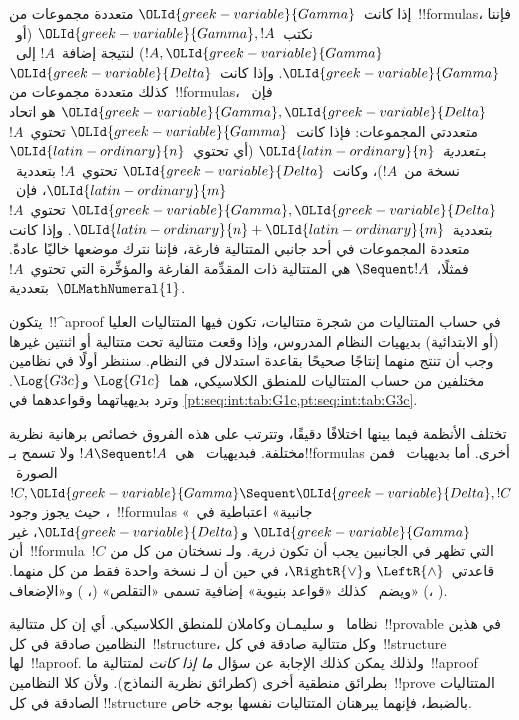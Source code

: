 \documentclass[../../../include/open-logic-section]{subfiles}
\begin{document}
إذا كانت~$\OLId{greek-variable}{Gamma}$ متعددة مجموعات من~!!{formula}s، فإننا نكتب~$\OLId{greek-variable}{Gamma},!A$
(أو~$!A,\OLId{greek-variable}{Gamma}$) لنتيجة إضافة~$!A$ إلى~$\OLId{greek-variable}{Gamma}$. وإذا كانت~$\OLId{greek-variable}{Delta}$ كذلك
متعددة مجموعات من~!!{formula}s، فإن~$\OLId{greek-variable}{Gamma},\OLId{greek-variable}{Delta}$ هو اتحاد متعددتي
المجموعات: فإذا كانت~$\OLId{greek-variable}{Gamma}$ تحتوي~$!A$ بـ\emph{تعددية}~$\OLId{latin-ordinary}{n}$ (أي تحتوي~$\OLId{latin-ordinary}{n}$ نسخة
من~$!A$)، وكانت~$\OLId{greek-variable}{Delta}$ تحتوي~$!A$ بتعددية~$\OLId{latin-ordinary}{m}$، فإن~$\OLId{greek-variable}{Gamma},\OLId{greek-variable}{Delta}$
تحتوي~$!A$ بتعددية~$\OLId{latin-ordinary}{n}+\OLId{latin-ordinary}{m}$. وإذا كانت متعددة المجموعات في أحد جانبي
المتتالية فارغة، فإننا نترك موضعها خاليًا عادةً. فمثلًا،~$\Sequent !A$
هي المتتالية ذات المقدِّمة الفارغة والمؤخِّرة التي تحتوي~$!A$ بتعددية~$\OLMathNumeral{1}$.

يتكون~!!^a{proof} في حساب المتتاليات من شجرة متتاليات، تكون فيها
المتتاليات العليا (أو الابتدائية) بديهيات النظام المدروس، وإذا وقعت متتالية
تحت متتالية أو اثنتين غيرها وجب أن تنتج منهما إنتاجًا صحيحًا بقاعدة
استدلال في النظام. سننظر أولًا في نظامين مختلفين من حساب المتتاليات للمنطق
الكلاسيكي، هما~$\Log{G1c}$ و$\Log{G3c}$. وترد بديهياتهما وقواعدهما في
\cref{pt:seq:int:tab:G1c,pt:seq:int:tab:G3c}. 




تختلف الأنظمة فيما بينها اختلافًا دقيقًا، وتترتب على هذه الفروق خصائص
برهانية نظرية مختلفة. فبديهيات~ هي~$!A\Sequent !A$ ولا تسمح
بـ!!{formula}s أخرى. أما بديهيات~ فمن الصورة~$!C,\OLId{greek-variable}{Gamma}\Sequent
\OLId{greek-variable}{Delta},!C$، حيث يجوز وجود~!!{formula}s «جانبية» اعتباطية في~$\OLId{greek-variable}{Gamma}$
و$\OLId{greek-variable}{Delta}$، غير أن~!!{formula}~$!C$ التي تظهر في الجانبين يجب أن تكون
\emph{ذرية}. ولـ نسختان من كل من قاعدتي~$\LeftR{\land}$
و$\RightR{\lor}$، في حين أن لـ نسخة واحدة فقط من كل منهما.
ويضم~ كذلك «قواعد بنيوية» إضافية تسمى «التقلص»
(\LeftR{\Contraction}، \RightR{\Contraction}) و«الإضعاف»
(\LeftR{\Weakening}، \RightR{\Weakening}).

نظاما~ و سليمـان وكاملان للمنطق الكلاسيكي. أي إن كل
متتالية~!!{provable} في هذين النظامين صادقة في كل~!!{structure}، وكل
متتالية صادقة في كل~!!{structure} لها~!!a{proof}. ولذلك يمكن كذلك الإجابة
عن سؤال \emph{ما إذا كانت} لمتتالية ما~!!a{proof} بطرائق منطقية أخرى (كطرائق
نظرية النماذج). ولأن كلا النظامين~!!{prove} المتتاليات الصادقة في كل
!!{structure} بالضبط، فإنهما يبرهنان المتتاليات نفسها بوجه خاص.
\end{document}
